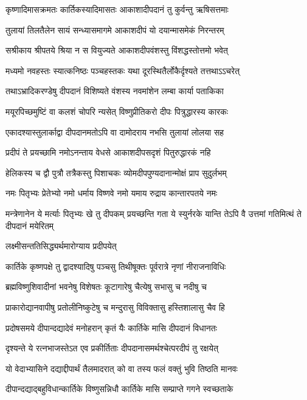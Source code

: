 \twolineshloka
{कृष्णादिमासक्रमतः कार्तिकस्यादिमासतः}
{आकाशादीपदानं तु कुर्वन्तु ऋषिसत्तमाः} %

\twolineshloka
{तुलायां तिलतैलेन सायं सन्ध्यासमागमे}
{आकाशदीपं यो दयान्मासमेकं निरन्तरम्} %

\twolineshloka
{सश्रीकाय श्रीपतये श्रिया न स वियुज्यते}
{आकाशदीपवंशस्तु विंशद्धस्तोत्तमो भवेत्} %

\twolineshloka
{मध्यमो नवहस्तः स्यात्कनिष्ठः पञ्चहस्तकः}
{यथा दूरस्थितैर्लोकैर्दृश्यते तत्तथाऽऽचरेत्} %

\twolineshloka
{तथाऽभ्रादिकरण्डेषु दीपदानं विशिष्यते}
{वंशस्य नवमांशेन लम्बा कार्या पताकिका} %

\twolineshloka
{मयूरपिच्छमुष्टिं वा कलशं चोपरि न्यसेत्}
{विष्णुप्रीतिकरो दीपः पित्रुद्धारस्य कारकः} %

\twolineshloka
{एकादश्यास्तुलार्काद्वा दीपदानमतोऽपि वा}
{दामोदराय नभसि तुलायां लोलया सह} %

\twolineshloka
{प्रदीपं ते प्रयच्छामि नमोऽनन्ताय वेधसे}
{आकाशदीपसदृशं पितुरुद्धारकं नहि} %

\twolineshloka
{हेलिकस्य च द्वौ पुत्रौ तत्रैकस्तु पिशाचकः}
{व्योमदीपपुण्यदानान्मोक्षं प्राप सुदुर्लभम्} %

\twolineshloka
{नमः पितृभ्यः प्रेतेभ्यो नमो धर्माय विष्णवे}
{नमो यमाय रुद्राय कान्तारपतये नमः} %

\threelineshloka
{मन्त्रेणानेन ये मर्त्याः पितृभ्यः खे तु दीपकम्}
{प्रयच्छन्ति गता ये स्युर्नरके यान्ति तेऽपि वै}
{उत्तमां गतिमित्थं ते दीपदानं मयेरितम्} %


\onelineshloka
{लक्ष्मीसन्ततिसिद्ध्यर्थमारोग्याय प्रदीपयेत्} %

\twolineshloka
{कार्तिके कृष्णपक्षे तु द्वादश्यादिषु पञ्चसु}
{तिथीषूक्तः पूर्वरात्रे नृणां नीराजनाविधिः} %

\twolineshloka
{ब्रह्मविष्णुशिवादीनां भवनेषु विशेषतः}
{कूटागारेषु चैत्येषु सभासु च नदीषु च} %

\twolineshloka
{प्राकारोद्यानवापीषु प्रतोलीनिष्कुटेषु च}
{मन्दुरासु विविक्तासु हस्तिशालासु चैव हि} %

\twolineshloka
{प्रदोषसमये दीपान्दद्यादेवं मनोहरान्}
{कृतं यैः कार्तिके मासि दीपदानं विधानतः} %

\twolineshloka
{दृश्यन्ते ये रत्नभाजस्तेऽत एव प्रकीर्तिताः}
{दीपदानासमर्थश्चेत्परदीपं तु रक्षयेत्} %

\twolineshloka
{यो वेदाभ्यासिने दद्याद्दीपार्थं तैलमादरात्}
{को वा तस्य फलं वक्तुं भुवि तिष्ठति मानवः} %

\twolineshloka
{दीपान्दद्याद्बहुविधान्कार्तिके विष्णुसन्निधौ}
{कार्तिके मासि सम्प्राप्ते गगने स्वच्छताके} %

